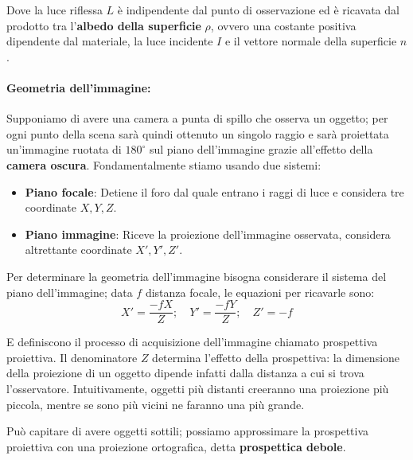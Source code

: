 \noindent Dove la luce riflessa $L$ è indipendente dal punto di osservazione ed è ricavata dal prodotto tra l'\textbf{albedo della superficie} $\rho$,
ovvero una costante positiva dipendente dal materiale, la luce incidente $I$ e il vettore normale della superficie $n$.

\paragraph{Geometria dell'immagine:} Supponiamo di avere una camera a punta di spillo che osserva un oggetto; per ogni punto della scena sarà quindi
ottenuto un singolo raggio e sarà proiettata un'immagine ruotata di $180^\circ$ sul piano dell'immagine grazie all'effetto della \textbf{camera oscura}.
Fondamentalmente stiamo usando due sistemi: \begin{itemize}
	\item \textbf{Piano focale}: Detiene il foro dal quale entrano i raggi di luce e considera tre coordinate $X, Y, Z$.
	\item \textbf{Piano immagine}: Riceve la proiezione dell'immagine osservata, considera altrettante coordinate $X', Y', Z'$.
\end{itemize}

\noindent Per determinare la geometria dell'immagine bisogna considerare il sistema del piano dell'immagine; data $f$ distanza focale, le equazioni per
ricavarle sono: \[
	X' = \frac{-fX}{Z};\quad Y' = \frac{-fY}{Z};\quad Z' = -f
\]

\noindent E definiscono il processo di acquisizione dell'immagine chiamato prospettiva proiettiva. Il denominatore $Z$ determina l'effetto della
prospettiva: la dimensione della proiezione di un oggetto dipende infatti dalla distanza a cui si trova l'osservatore. Intuitivamente, oggetti più
distanti creeranno una proiezione più piccola, mentre se sono più vicini ne faranno una più grande.\par
Può capitare di avere oggetti sottili; possiamo approssimare la prospettiva proiettiva con una proiezione ortografica, detta \textbf{prospettica debole}.

%

